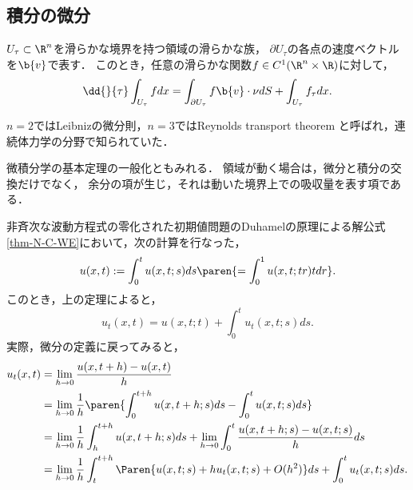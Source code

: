 \documentclass[uplatex,dvipdfmx]{jsreport}
\begin{document}
\subsection{積分の微分}

\begin{tcolorbox}[colframe=ForestGreen, colback=ForestGreen!10!white,breakable,colbacktitle=ForestGreen!40!white,coltitle=black,fonttitle=\bfseries\sffamily,
title=]
    
\end{tcolorbox}

\begin{theorem}\label{thm-differentiation-of-integral-on-moving-region}
    $U_\tau\subset\R^n$を滑らかな境界を持つ領域の滑らかな族，
    $\partial U_\tau$の各点の速度ベクトルを$\b{v}$で表す．
    このとき，任意の滑らかな関数$f\in C^1(\R^n\times\R)$に対して，
    \[\dd{}{\tau}\int_{U_\tau}fdx=\int_{\partial U_\tau}f\b{v}\cdot\nu dS+\int_{U_\tau}f_\tau dx.\]
\end{theorem}
\begin{history}
    $n=2$ではLeibnizの微分則，$n=3$ではReynolds transport theorem
    と呼ばれ，連続体力学の分野で知られていた．
\end{history}
\begin{remarks}[物理的直感の先行]
    微積分学の基本定理の一般化ともみれる．
    領域が動く場合は，微分と積分の交換だけでなく，
    余分の項が生じ，それは動いた境界上での吸収量を表す項である．
\end{remarks}

\begin{example}\label{exp-moving-region-appeared-in-N-C-WE}
    非斉次な波動方程式の零化された初期値問題のDuhamelの原理による解公式\ref{thm-N-C-WE}において，次の計算を行なった，
    \[u(x,t):=\int^t_0u(x,t;s)ds\paren{=\int^1_0u(x,t;tr)tdr}.\]
    このとき，上の定理によると，
    \[u_t(x,t)=u(x,t;t)+\int^t_0u_t(x,t;s)ds.\]
    実際，微分の定義に戻ってみると，
    \begin{align*}
        u_t(x,t)&=\lim_{h\to0}\frac{u(x,t+h)-u(x,t)}{h}\\
        &=\lim_{h\to0}\frac{1}{h}\paren{\int^{t+h}_0u(x,t+h;s)ds-\int^t_0u(x,t;s)ds}\\
        &=\lim_{h\to0}\frac{1}{h}\int^{t+h}_hu(x,t+h;s)ds+\lim_{h\to0}\int^t_0\frac{u(x,t+h;s)-u(x,t;s)}{h}ds\\
        &=\lim_{h\to0}\frac{1}{h}\int^{t+h}_t\Paren{u(x,t;s)+hu_t(x,t;s)+O(h^2)}ds+\int^t_0u_t(x,t;s)ds.
    \end{align*}
\end{example}
\end{document}
